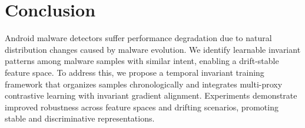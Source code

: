 \section{Conclusion}
Android malware detectors suffer performance degradation due to natural distribution changes caused by malware evolution. We identify learnable invariant patterns among malware samples with similar intent, enabling a drift-stable feature space. To address this, we propose a temporal invariant training framework that organizes samples chronologically and integrates multi-proxy contrastive learning with invariant gradient alignment. Experiments demonstrate improved robustness across feature spaces and drifting scenarios, promoting stable and discriminative representations.

